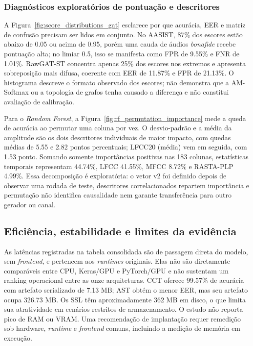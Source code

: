 \documentclass[12pt,a4paper]{article}
\begin{document}
\subsubsection{Diagnósticos exploratórios de pontuação e descritores}

A Figura~\ref{fig:score_distributions_gat} esclarece por que acurácia, EER e
matriz de confusão precisam ser lidos em conjunto. No AASIST, \num{87}\% dos
escores estão abaixo de \num{0,05} ou acima de \num{0,95}, porém uma cauda de
áudios \textit{bonafide} recebe pontuação alta; no limiar \num{0,5}, isso se
manifesta como FPR de \num{9,55}\% e FNR de \num{1,01}\%. RawGAT-ST concentra
apenas \num{25}\% dos escores nos extremos e apresenta sobreposição mais difusa,
coerente com EER de \num{11,87}\% e FPR de \num{21,13}\%. O histograma descreve
o formato observado dos escores; não demonstra que a AM-Softmax ou a topologia
de grafos tenha causado a diferença e não constitui avaliação de calibração.

Para o \textit{Random Forest}, a Figura~\ref{fig:rf_permutation_importance}
mede a queda de acurácia ao permutar uma coluna por vez. O desvio-padrão e a
média da amplitude são os dois descritores individuais de maior impacto, com
quedas médias de \num{5,55} e \num{2,82} pontos percentuais; LFCC20 (média) vem
em seguida, com \num{1,53} ponto. Somando somente importâncias positivas nas
\num{183} colunas, estatísticas temporais representam \num{44,74}\%, LFCC
\num{41,55}\%, MFCC \num{8,72}\% e RASTA-PLP \num{4,99}\%. Essa decomposição é
exploratória: o vetor v2 foi definido depois de observar uma rodada de teste,
descritores correlacionados repartem importância e permutação não identifica
causalidade nem garante transferência para outro gerador ou canal.

\subsection{Eficiência, estabilidade e limites da evidência}
\label{sec:custo_estabilidade}

As latências registradas na tabela consolidada são de passagem direta do modelo,
sem \textit{frontend}, e pertencem aos \textit{runtimes} originais. Elas não
são diretamente comparáveis entre CPU, Keras/GPU e PyTorch/GPU e não sustentam
um ranking operacional entre as onze arquiteturas. CCT oferece \num{99,57}\%
de acurácia com artefato serializado de \num{7,13} MB; AST obtém o menor EER,
mas seu artefato ocupa \num{326,73} MB. Os SSL têm aproximadamente
\num{362} MB em disco, o que limita sua atratividade em cenários restritos de
armazenamento. O estudo não reporta pico de RAM ou VRAM. Uma recomendação de
implantação requer remedição sob hardware, \textit{runtime} e \textit{frontend}
comuns, incluindo a medição de memória em execução.
\end{document}
